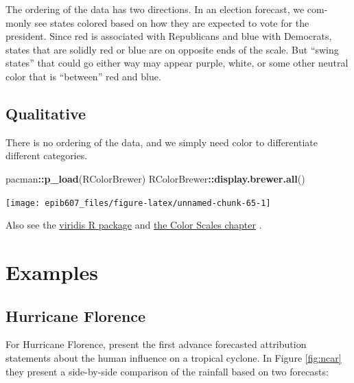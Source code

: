 \documentclass[]{book}
\makeatletter
\newenvironment{Shaded}{\begin{snugshade}}{\end{snugshade}}
\newcommand{\KeywordTok}[1]{\textcolor[rgb]{0.13,0.29,0.53}{\textbf{#1}}}
\newcommand{\OperatorTok}[1]{\textcolor[rgb]{0.81,0.36,0.00}{\textbf{#1}}}
\newcommand{\NormalTok}[1]{#1}
\newenvironment{kframe}{%
\medskip{}
\setlength{\fboxsep}{.8em}
 \def\at@end@of@kframe{}%
 \ifinner\ifhmode%
  \def\at@end@of@kframe{\end{minipage}}%
  \begin{minipage}{\columnwidth}%
 \fi\fi%
 \def\FrameCommand##1{\hskip\@totalleftmargin \hskip-\fboxsep
 \colorbox{shadecolor}{##1}\hskip-\fboxsep
     \hskip-\linewidth \hskip-\@totalleftmargin \hskip\columnwidth}%
 \MakeFramed {\advance\hsize-\width
   \@totalleftmargin\z@ \linewidth\hsize
   \@setminipage}}%
 {\par\unskip\endMakeFramed%
 \at@end@of@kframe}
\renewenvironment{Shaded}{\begin{kframe}}{\end{kframe}}
\theoremstyle{definition}
\theoremstyle{definition}
\theoremstyle{definition}
\theoremstyle{remark}
\makeatother
\begin{document}
The ordering of the data has two directions. In an election forecast, we
com- monly see states colored based on how they are expected to vote for
the president. Since red is associated with Republicans and blue with
Democrats, states that are solidly red or blue are on opposite ends of
the scale. But ``swing states'' that could go either way may appear
purple, white, or some other neutral color that is ``between'' red and
blue.

\subsection{Qualitative}\label{qualitative}

There is no ordering of the data, and we simply need color to
differentiate different categories.

\begin{Shaded}
\begin{Highlighting}[]
\NormalTok{pacman}\OperatorTok{::}\KeywordTok{p_load}\NormalTok{(RColorBrewer)}
\NormalTok{RColorBrewer}\OperatorTok{::}\KeywordTok{display.brewer.all}\NormalTok{()}
\end{Highlighting}
\end{Shaded}

\begin{center}\texttt{[image: epib607\_files/figure-latex/unnamed-chunk-65-1]} \end{center}

Also see the
\href{https://cran.r-project.org/web/packages/viridis/vignettes/intro-to-viridis.html}{viridis
R package} and
\href{https://serialmentor.com/dataviz/color-basics.html}{the Color
Scales chapter} \citep{wilke}.

\section{Examples}\label{examples}

\subsection{Hurricane Florence}\label{hurricane-florence}

For Hurricane Florence, \citet{ncar} present the first advance
forecasted attribution statements about the human influence on a
tropical cyclone. In Figure \ref{fig:ncar} they present a side-by-side
comparison of the rainfall based on two forecasts:
\end{document}

